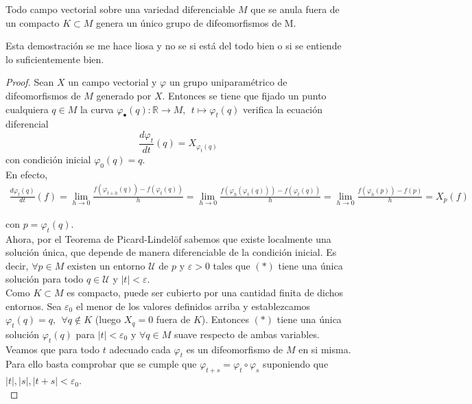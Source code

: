 \bigskip
\begin{lemma}
\label{unidiff}
    Todo campo vectorial sobre una variedad diferenciable $M$ que se anula fuera de un compacto $K\subset M$ genera un único grupo de difeomorfismos de M.
\end{lemma}
{\color{blue} Esta demostración se me hace liosa y no se si está del todo bien o si se entiende lo suficientemente bien.}
\begin{proof}
    Sean $X$ un campo vectorial y $\varphi$ un grupo uniparamétrico de difeomorfismos de $M$ generado por $X$. Entonces se tiene que fijado un punto cualquiera $q\in M$ la curva $\varphi_\bullet(q): \mathbb{R}\to M,~~ t\mapsto \varphi_t(q)$ verifica la ecuación diferencial
    \begin{equation*}
        \frac{d\varphi_t}{dt}(q)=X_{\varphi_t(q)}\tag{$\ast$}
    \end{equation*}
    con condición inicial $\varphi_0(q)=q$.\\

    En efecto,
    \begin{align*}
        \frac{d\varphi_t(q)}{dt}(f)=\lim_{h\to 0} \frac{f(\varphi_{t+h}(q))- f(\varphi_t(q))}{h} = \lim_{h\to 0} \frac{f(\varphi_{h}(\varphi_t(q)))- f(\varphi_t(q))}{h} = \lim_{h\to 0} \frac{f(\varphi_{h}(p))- f(p)}{h} = X_p(f)
    \end{align*}

    con $p=\varphi_t(q)$.\\

    Ahora, por el Teorema de Picard-Lindelöf sabemos que existe localmente una solución única, que depende de manera diferenciable de la condición inicial. Es decir, $\forall p\in M$ existen un entorno $\mathcal{U}$ de $p$ y $\varepsilon > 0$ tales que $(\ast)$ tiene una única solución para todo $q\in \mathcal{U}$ y $|t|<\varepsilon$.\\

    Como $K\subset M$ es compacto, puede ser cubierto por una cantidad finita de dichos entornos. Sea $\varepsilon_0$ el menor de los valores definidos arriba y establezcamos $\varphi_t(q)=q,~~\forall q\notin K$ (luego $X_q=0$ fuera de $K$). Entonces $(\ast)$ tiene una única solución $\varphi_t(q)$ para $|t|<\varepsilon_0$ y $\forall q\in M$ suave respecto de ambas variables.\\

    Veamos que para todo $t$ adecuado cada $\varphi_t$ es un difeomorfismo de $M$ en si misma. Para ello basta comprobar que se cumple que $\varphi_{t+s}=\varphi_t\circ \varphi_s$ suponiendo que $|t|,|s|,|t+s|<\varepsilon_0$.\\


\end{proof}
